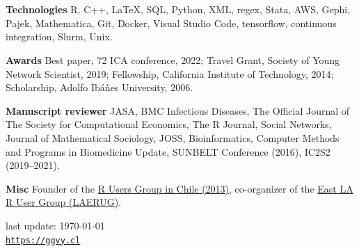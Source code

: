 \documentclass[letterpaper, 10pt]{article}
\newcommand{\myorange}{myteal!70!black}
\newcommand{\darkorange}{\myorange !50!black}
\renewcommand{\textbf}[1]{{\bfseries\color{\myorange}#1}}
\def\footerlink{https://ggvy.cl}
\renewenvironment{itemize}{
  \begin{list}{}{
    \setlength{\leftmargin}{0.3cm}
  }
}{
  \end{list}
}
\begin{document}
\section*{\color{\darkorange}{Honors and Professional Achievements}}
\vspace{-.25cm}

\begin{itemize}
\item \textbf{Technologies} R, C++, \LaTeX, SQL, Python, XML, regex, Stata, AWS, Gephi, Pajek, Mathematica, Git, Docker, Visual Studio Code, tensorflow, continuous integration, Slurm, Unix.
\item \textbf{Awards} Best paper, 72 ICA conference, 2022; Travel Grant, Society of Young Network Scientist, 2019; Fellowship, California Institute of Technology, 2014; Scholarship, Adolfo Ib\'a\~nes University, 2006.
\item \textbf{Manuscript reviewer} JASA, BMC Infectious Diseases, The Official Journal of The Society for Computational Economics, The R Journal, Social Networks, Journal of Mathematical Sociology, JOSS, Bioinformatics, Computer Methods and Programs in Biomedicine Update, SUNBELT Conference (2016), IC2S2 (2019--2021).
\item \textbf{Misc} Founder of the \href{https://www.meetup.com/useRchile/}{R Users Group in Chile (2013)}, co-organizer of the \href{https://socalr.org}{East LA R User Group (LAERUG)}.
\end{itemize}

\begin{center}
 \begin{footnotesize}
   last update: \today \\
   \href{\footerlink}{\texttt{\footerlink}}
 \end{footnotesize}
\end{center}
\end{document}
